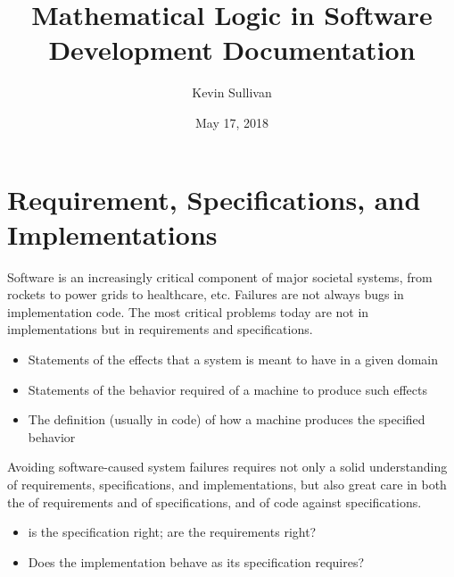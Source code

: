 \documentclass[letterpaper,10pt,english]{sphinxmanual}
\title{Mathematical Logic in Software Development Documentation}
\date{May 17, 2018}
\author{Kevin Sullivan}
\begin{document}
\maketitle
\sphinxtableofcontents
{}\label{\detokenize{index::doc}}



\chapter{Requirement, Specifications, and Implementations}
\label{\detokenize{01-reqs-specs-impls:welcome-to-mathematical-logic-in-software-development}}\label{\detokenize{01-reqs-specs-impls:requirement-specifications-and-implementations}}\label{\detokenize{01-reqs-specs-impls::doc}}
Software is an increasingly critical component of major societal
systems, from rockets to power grids to healthcare, etc. Failures are
not always bugs in implementation code. The most critical problems
today are not in implementations but in requirements and
specifications.
\begin{itemize}
\item {} 
 Statements of the effects that a system is meant to have in a given domain

\item {} 
 Statements of the behavior required of a machine to produce such effects

\item {} 
 The definition (usually in code) of how a machine produces the specified behavior

\end{itemize}

Avoiding software-caused system failures requires not only a solid
understanding of requirements, specifications, and implementations,
but also great care in both the  of requirements and of
specifications, and  of code against specifications.
\begin{itemize}
\item {} 
  is the specification right; are the requirements right?

\item {} 
  Does the implementation behave as its specification requires?

\end{itemize}
\end{document}
